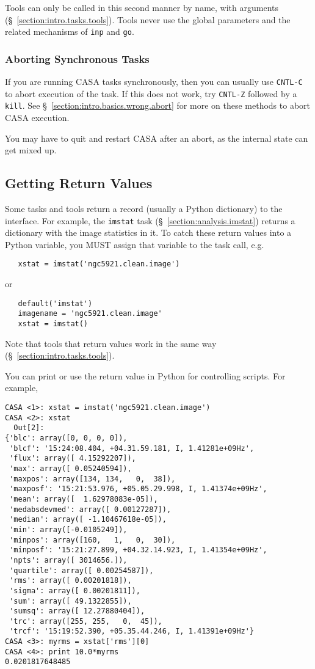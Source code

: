 Tools can only be called in this second manner by name, with
arguments (\S~\ref{section:intro.tasks.tools}).  Tools never use the
global parameters and the related mechanisms of {\tt inp} and {\tt go}.

\subsubsection{Aborting Synchronous Tasks}
\label{section:intro.tasks.run.abort}

If you are running CASA tasks synchronously, then you can usually use
{\tt CNTL-C} to abort execution of the task.  If this does not work,
try {\tt CNTL-Z} followed by a {\tt kill}.
See \S~\ref{section:intro.basics.wrong.abort} for more on these
methods to abort CASA execution.

You may have to quit and restart CASA after an abort, as the internal
state can get mixed up.

\subsection{Getting Return Values}
\label{section:intro.tasks.return}

Some tasks and tools return a record (usually a Python dictionary)
to the interface.  For example, the {\tt imstat} task 
(\S~\ref{section:analysis.imstat}) returns a dictionary with the
image statistics in it.  To catch these return values into a
Python variable, you MUST assign that variable to the task call, e.g.
\small
\begin{verbatim}
   xstat = imstat('ngc5921.clean.image')
\end{verbatim}
\normalsize
or 
\small
\begin{verbatim}
   default('imstat')
   imagename = 'ngc5921.clean.image'
   xstat = imstat()
\end{verbatim}
\normalsize
Note that tools that return values work in the same way
(\S~\ref{section:intro.tasks.tools}).

You can print or use the return value in Python for controlling
scripts.  For example,
\small
\begin{verbatim}
CASA <1>: xstat = imstat('ngc5921.clean.image')
CASA <2>: xstat
  Out[2]: 
{'blc': array([0, 0, 0, 0]),
 'blcf': '15:24:08.404, +04.31.59.181, I, 1.41281e+09Hz',
 'flux': array([ 4.15292207]),
 'max': array([ 0.05240594]),
 'maxpos': array([134, 134,   0,  38]),
 'maxposf': '15:21:53.976, +05.05.29.998, I, 1.41374e+09Hz',
 'mean': array([  1.62978083e-05]),
 'medabsdevmed': array([ 0.00127287]),
 'median': array([ -1.10467618e-05]),
 'min': array([-0.0105249]),
 'minpos': array([160,   1,   0,  30]),
 'minposf': '15:21:27.899, +04.32.14.923, I, 1.41354e+09Hz',
 'npts': array([ 3014656.]),
 'quartile': array([ 0.00254587]),
 'rms': array([ 0.00201818]),
 'sigma': array([ 0.00201811]),
 'sum': array([ 49.1322855]),
 'sumsq': array([ 12.27880404]),
 'trc': array([255, 255,   0,  45]),
 'trcf': '15:19:52.390, +05.35.44.246, I, 1.41391e+09Hz'}
CASA <3>: myrms = xstat['rms'][0]
CASA <4>: print 10.0*myrms
0.0201817648485
\end{verbatim}
\normalsize

